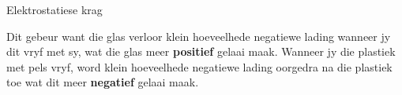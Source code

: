 \begin{Investigation}{Elektrostatiese krag}
\begin{figure}[H]
\begin{center}
% 
% 
% 
% 
  \end{center}
 \end{figure}         
      \par 

Dit gebeur want die glas verloor klein hoeveelhede negatiewe lading wanneer jy dit vryf met sy, wat die glas meer \textbf{positief} gelaai maak. Wanneer jy die plastiek met pels vryf, word klein hoeveelhede negatiewe lading oorgedra na die plastiek toe wat dit meer \textbf{negatief} gelaai maak.\par

\end{Investigation}


